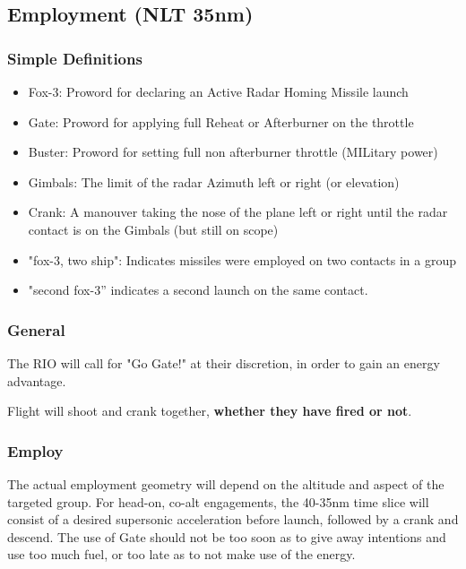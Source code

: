 \subsection{Employment (NLT 35nm)}

\subsubsection*{Simple Definitions}

\begin{itemize}

  \item Fox-3: Proword for declaring an Active Radar Homing Missile launch

  \item Gate: Proword for applying full Reheat or Afterburner on the throttle

  \item Buster: Proword for setting full non afterburner throttle (MILitary
    power)

  \item Gimbals: The limit of the radar Azimuth left or right (or elevation)

  \item Crank: A manouver taking the nose of the plane left or right until the
    radar contact is on the Gimbals (but still on scope)

  \item "fox-3, two ship": Indicates missiles were employed on two contacts in
    a group

  \item "second fox-3” indicates a second launch on the same contact.

\end{itemize}

\subsubsection*{General}

The RIO will call for "Go Gate!" at their discretion, in order to gain an
energy advantage.

Flight will shoot and crank together, \textbf{whether they have fired or not}.

\subsubsection*{Employ}

The actual employment geometry will depend on the altitude and aspect of the
targeted group. For head-on, co-alt engagements, the 40-35nm time slice will
consist of a desired supersonic acceleration before launch, followed by a crank
and descend. The use of Gate should not be too soon as to give away intentions
and use too much fuel, or too late as to not make use of the energy.

